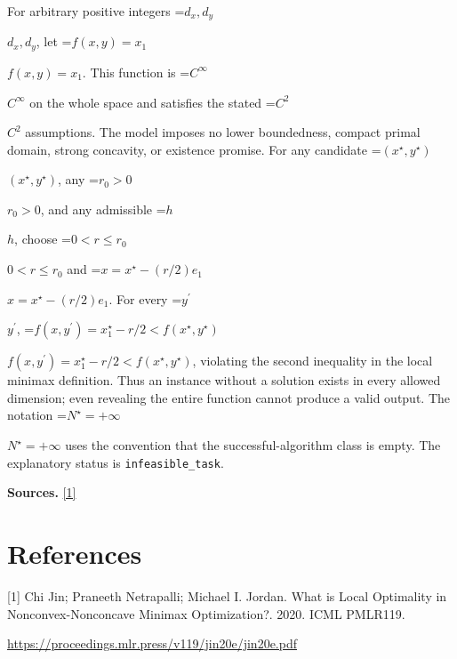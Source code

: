 \documentclass[10pt,a4paper]{article}
\newcommand{\AtlasMath}[1]{\par\begingroup\centering\setbox0=\hbox{$\displaystyle #1$}\ifdim\wd0>1.4\linewidth\typeout{ATLAS WIDE FORMULA: \the\wd0}\fi\ifdim\wd0>\linewidth\resizebox{\linewidth}{!}{\box0}\else\box0\fi\par\endgroup}
\newcommand{\AtlasInlineMath}[1]{\begingroup\setbox0=\hbox{$#1$}\ifdim\wd0>.4\linewidth\endgroup\AtlasMath{#1}\else\endgroup$#1$\fi}
\begin{document}
For arbitrary positive integers \AtlasInlineMath{d_x,d_y}, let \AtlasInlineMath{f(x,y)=x_1}. This function is \AtlasInlineMath{C^\infty} on the whole space and satisfies the stated \AtlasInlineMath{C^2} assumptions. The model imposes no lower boundedness, compact primal domain, strong concavity, or existence promise. For any candidate \AtlasInlineMath{(x^\star,y^\star)}, any \AtlasInlineMath{r_0>0}, and any admissible \AtlasInlineMath{h}, choose \AtlasInlineMath{0<r\le r_0} and \AtlasInlineMath{x=x^\star-(r/2)e_1}. For every \AtlasInlineMath{y^\prime}, \AtlasInlineMath{f(x,y^\prime)=x_1^\star-r/2<f(x^\star,y^\star)}, violating the second inequality in the local minimax definition. Thus an instance without a solution exists in every allowed dimension; even revealing the entire function cannot produce a valid output. The notation \AtlasInlineMath{N^\star=+\infty} uses the convention that the successful-algorithm class is empty. The explanatory status is \texttt{infeasible\_\allowbreak{}task}.

\textbf{Sources.} \href{https://proceedings.mlr.press/v119/jin20e/jin20e.pdf}{[1]}

\section{References}
[1] Chi Jin; Praneeth Netrapalli; Michael I. Jordan. What is Local Optimality in Nonconvex-Nonconcave Minimax Optimization?. 2020. ICML PMLR119.

\url{https://proceedings.mlr.press/v119/jin20e/jin20e.pdf}
\end{document}
